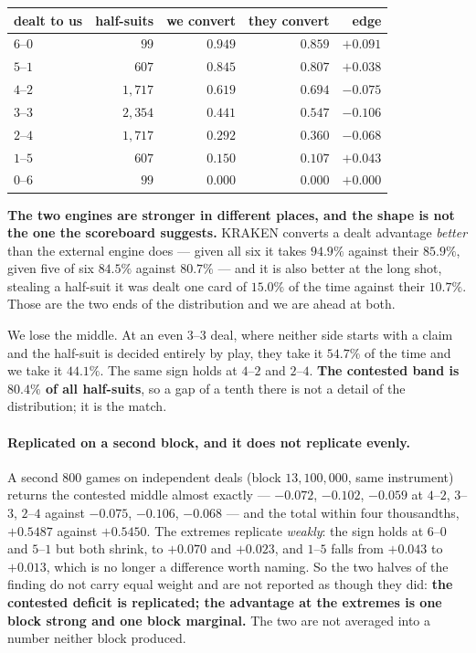 \documentclass[11pt,letterpaper]{article}
\begin{document}
\begin{center}
\small
\begin{tabular}{lrrrr}
\toprule
dealt to us & half-suits & we convert & they convert & edge \\
\midrule
$6$--$0$ & $99$   & $0.949$ & $0.859$ & $\mathbf{+0.091}$ \\
$5$--$1$ & $607$  & $0.845$ & $0.807$ & $\mathbf{+0.038}$ \\
$4$--$2$ & $1{,}717$ & $0.619$ & $0.694$ & $-0.075$ \\
$3$--$3$ & $2{,}354$ & $0.441$ & $0.547$ & $\mathbf{-0.106}$ \\
$2$--$4$ & $1{,}717$ & $0.292$ & $0.360$ & $-0.068$ \\
$1$--$5$ & $607$  & $0.150$ & $0.107$ & $\mathbf{+0.043}$ \\
$0$--$6$ & $99$   & $0.000$ & $0.000$ & $+0.000$ \\
\bottomrule
\end{tabular}
\end{center}

\noindent \textbf{The two engines are stronger in different places, and the
shape is not the one the scoreboard suggests.} KRAKEN converts a dealt
advantage \emph{better} than the external engine does --- given all six it
takes $94.9\%$ against their $85.9\%$, given five of six $84.5\%$ against
$80.7\%$ --- and it is also better at the long shot, stealing a half-suit it
was dealt one card of $15.0\%$ of the time against their $10.7\%$. Those are
the two ends of the distribution and we are ahead at both.

We lose the middle. At an even $3$--$3$ deal, where neither side starts with a
claim and the half-suit is decided entirely by play, they take it $54.7\%$ of
the time and we take it $44.1\%$. The same sign holds at $4$--$2$ and
$2$--$4$. \textbf{The contested band is $80.4\%$ of all half-suits}, so a gap
of a tenth there is not a detail of the distribution; it is the match.

\paragraph{Replicated on a second block, and it does not replicate evenly.}
A second $800$ games on independent deals (block $13{,}100{,}000$, same
instrument) returns the contested middle almost exactly --- $-0.072$,
$-0.102$, $-0.059$ at $4$--$2$, $3$--$3$, $2$--$4$ against $-0.075$,
$-0.106$, $-0.068$ --- and the total within four thousandths, $+0.5487$
against $+0.5450$. The extremes replicate \emph{weakly}: the sign holds at
$6$--$0$ and $5$--$1$ but both shrink, to $+0.070$ and $+0.023$, and
$1$--$5$ falls from $+0.043$ to $\mathbf{+0.013}$, which is no longer a
difference worth naming. So the two halves of the finding do not carry equal
weight and are not reported as though they did: \textbf{the contested
deficit is replicated; the advantage at the extremes is one block strong and
one block marginal.} The two are not averaged into a number neither block
produced.
\end{document}
